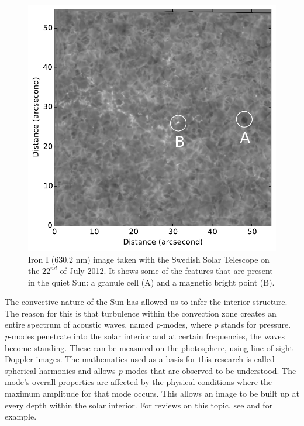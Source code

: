     \begin{figure}    
    	\centering
    	\includegraphics[width=\textwidth]{QS.pdf}
    	\caption{
    		Iron I ($630.2$ nm) image taken with the Swedish Solar Telescope on the $22^{{nd}}$ of July 2012.
    		It shows some of the features that are present in the quiet Sun: a granule cell (A) and a magnetic bright point (B).
    	}
    	\label{fig:photosphere}        
    \end{figure}   
       
    The convective nature of the Sun has allowed us to infer the interior structure. 
    The reason for this is that turbulence within the convection zone creates an entire spectrum of acoustic waves, named \textit{p}-modes, where \textit{p} stands for pressure.
    \textit{p}-modes penetrate into the solar interior and at certain frequencies, the waves become standing.
    These can be measured on the photosphere, using line-of-sight Doppler images. 
    The mathematics used as a basis for this research is called spherical harmonics and allows \textit{p}-modes that are observed to be understood.
    The mode's overall properties are affected by the physical conditions where the maximum amplitude for that mode occurs. 
    This allows an image to be built up at every depth within the solar interior.
    For reviews on this topic, see \cite{annurev.aa.22.090184.003113} and \cite{RevModPhys.74.1073} for example.
    
